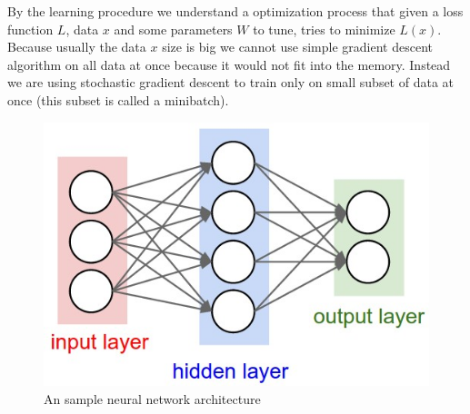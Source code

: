 By the learning procedure we understand a optimization process that given a
loss function $L$, data $x$ and some parameters $W$ to tune, tries to minimize $L(x)$.
Because usually the data $x$ size is big we cannot use simple gradient descent
algorithm on all data at once because it would not fit into the memory. Instead
we are using stochastic gradient descent to train only on small subset of data
at once (this subset is called a minibatch).

\begin{figure}[!htbp]
  \centering
  \includegraphics[width=0.6\linewidth]{img/nn/neural_net.jpeg}
  \caption{An sample neural network architecture} 
  \label{fig:sample_nn}
\end{figure}

